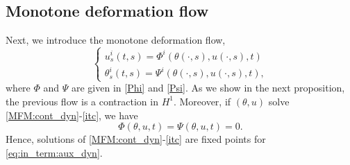 \documentclass[12pt]{amsart}
\newcommand{\1}{{\chi}}
\theoremstyle{definition}
\begin{document}
        \subsection{Monotone deformation flow} 
        \label{sub:deformation_flow}
                Next, we introduce the monotone deformation flow,
                \begin{equation} \label{eq:in_term:aux_dyn}
                        \begin{cases}
                                u_s^i(t,s)              = \Phi^i(\theta(\cdot, s), u(\cdot, s), t)\\
                                \theta_s^i(t,s) = \Psi^i(\theta(\cdot, s), u(\cdot, s), t),                
                        \end{cases}
                \end{equation}
                where $\Phi$ and $\Psi$ are given in \eqref{Phi} and \eqref{Psi}.
                As we show in the next proposition, the previous flow is a contraction in $H^1$. 
                Moreover, if $(\theta, u)$ solve  \eqref{MFM:cont_dyn}-\eqref{itc}, we have
                \[
                	\Phi(\theta, u, t)=\Psi(\theta, u, t)=0. 
                \]
                Hence, solutions of  \eqref{MFM:cont_dyn}-\eqref{itc}  are fixed points for \eqref{eq:in_term:aux_dyn}. 
\end{document}
